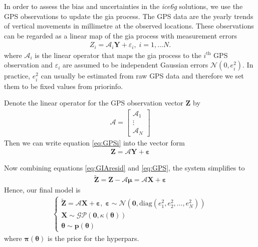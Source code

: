 \documentclass[a4paper,12pt]{article}
\begin{document}
In order to assess the bias and uncertainties in the \emph{ice6g} solutions, we use the GPS observations to update the \acrshort{gia} process. The GPS  data are the yearly trends of vertical movements in millimetre at the observed locations. These observations can be regarded as a linear map of the \acrshort{gia} process with measurement errors
\begin{align}\label{eq:GPSi}
Z_i = \bm{\mathcal{A}}_i\bm{Y} + \varepsilon_i, \; i = 1,\dots N.
\end{align} 
where $\bm{\mathcal{A}}_i$ is the linear operator that maps the \acrshort{gia} process to the $i^{\mbox{th}}$ GPS observation and $\varepsilon_i$ are assumed to be independent Gaussian errors $\mathcal{N}(0, e_i^2)$. In practice, $e_i^2$ can usually be estimated from raw GPS data and therefore we set them to be fixed values from \gls{priorinfo}. 

Denote the linear operator for the GPS observation vector $\bm{Z}$ by 
\begin{align*}
\bm{\mathcal{A}} = \left[\begin{array}{c}
 \bm{\mathcal{A}}_1\\ \vdots \\ \bm{\mathcal{A}}_N \end{array} \right]
\end{align*}
Then we can write equation \ref{eq:GPSi} into the vector form
\begin{align}\label{eq:GPS}
\bm{Z} = \bm{\mathcal{A}}\bm{Y} + \bm{\varepsilon} 
\end{align}

Now combining equations \ref{eq:GIAresid} and \ref{eq:GPS}, the system simplifies to
\begin{align}
\bm{\tilde{Z}} = \bm{Z} - \bm{\mathcal{A}}\bm{\mu}= \bm{\mathcal{A}}\bm{X} + \bm{\varepsilon}
\end{align}
Hence, our final model is
\begin{align}
\left\{ \begin{array}{l}
\bm{\tilde{Z}} = \bm{\mathcal{A}}\bm{X} + \bm{\varepsilon}, \; 
\bm{\varepsilon} \sim \mathcal{N} (\bm{0}, \mbox{diag}(e_1^2, e_2^2, \dots, e_N^2)) \\
\bm{X} \sim \mathcal{GP}(\bm{0}, \kappa(\bm{\theta})) \\
\bm{\theta} \sim \bm{p}(\bm{\theta})
\end{array} \right.
\end{align}
where $\bm{\pi}(\bm{\theta})$ is the \gls{prior} for the \gls{hyperpars}.
\end{document}
